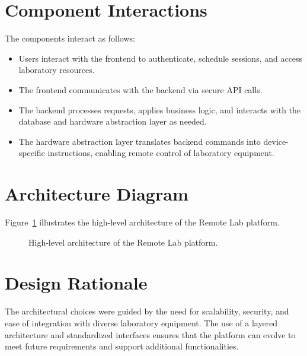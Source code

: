 %
%
\section{Component Interactions} \label{sec33}
The components interact as follows:
\begin{itemize}
    \item Users interact with the frontend to authenticate, schedule sessions, and access laboratory resources.
    \item The frontend communicates with the backend via secure API calls.
    \item The backend processes requests, applies business logic, and interacts with the database and hardware abstraction layer as needed.
    \item The hardware abstraction layer translates backend commands into device-specific instructions, enabling remote control of laboratory equipment.
\end{itemize}

%
%
\section{Architecture Diagram} \label{sec34}
Figure~\ref{fig:architecture} illustrates the high-level architecture of the Remote Lab platform.

\begin{figure}[h]
\begin{center}
\end{center}
\caption{High-level architecture of the Remote Lab platform.}\label{fig:architecture}
\end{figure}

%
%
\section{Design Rationale} \label{sec35}
The architectural choices were guided by the need for scalability, security, and ease of integration with diverse laboratory equipment. The use of a layered architecture and standardized interfaces ensures that the platform can evolve to meet future requirements and support additional functionalities.